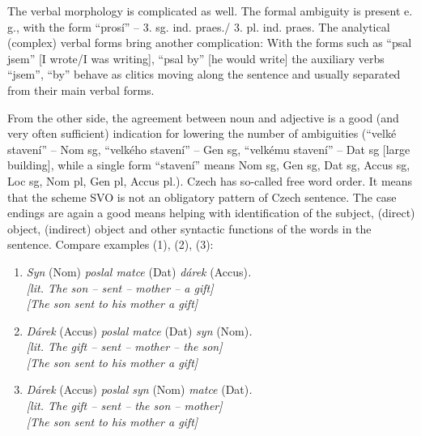 \begin{multicols}{2}
The verbal morphology is complicated as well. The formal ambiguity is present e.\,g., with the form “prosí” – 3. sg. ind. praes./ 3. pl. ind. praes. The analytical (complex) verbal forms bring another complication: With the forms such as “psal jsem” {[}I wrote/I was writing{]}, “psal by” {[}he would write{]} the auxiliary verbs “jsem”, “by”  behave as clitics moving along the sentence and usually separated from their main verbal forms.

From the other side, the agreement between noun and adjective is a good (and very often sufficient) indication for lowering the number of ambiguities (“velké stavení” – Nom sg, “velkého stavení” – Gen sg, “velkému stavení” – Dat sg {[}large building{]}, while a single form “stavení” means Nom sg, Gen sg, Dat sg, Accus sg, Loc sg, Nom pl, Gen pl, Accus pl.).
Czech has so-called free word order. It means that the scheme SVO is not an obligatory pattern of Czech sentence. The case endings are again a good means helping with identification of the subject, (direct) object, (indirect) object and other syntactic functions of the words in the sentence. Compare examples (1), (2), (3):

\begin{enumerate}
\item \textit{Syn} (Nom) \textit{poslal matce} (Dat) \textit{dárek} (Accus)\textit{.}\\
  \textit{{[}lit. The son -- sent – mother -- a gift{]}} \\
  \textit{{[}The son sent to his mother a gift{]}}

\item \textit{Dárek} (Accus) \textit{poslal matce} (Dat) \textit{syn} (Nom)\textit{.}\\
  \textit{{[}lit. The gift -- sent -- mother – the son{]}}\\
  \textit{{[}The son sent to his mother a gift{]}}

\item \textit{Dárek} (Accus) \textit{poslal syn} (Nom) \textit{matce} (Dat)\textit{.}\\
  \textit{{[}lit. The gift – sent – the son – mother{]}}\\
  \textit{{[}The son sent to his mother a gift{]}}
\end{enumerate}


\end{multicols}
